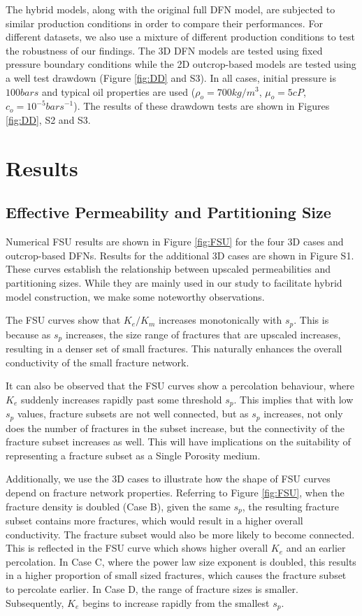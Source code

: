 \documentclass[draft]{agujournal2018}
\begin{document}
The hybrid models, along with the original full DFN model, are subjected to similar production conditions in order to compare their performances. For different datasets, we also use a mixture of different production conditions to test the robustness of our findings. The 3D DFN models are tested using fixed pressure boundary conditions while the 2D outcrop-based models are tested using a well test drawdown (Figure \ref{fig:DD} and S3). In all cases, initial pressure is $100 bars$ and typical oil properties are used ($\rho_o=700 kg/m^3$, $\mu_o=5 cP$, $c_o=10^{-5} {bars}^{-1}$). The results of these drawdown tests are shown in Figures \ref{fig:DD}, S2 and S3.

\section{Results}
\subsection{Effective Permeability and Partitioning Size}
Numerical FSU results are shown in Figure \ref{fig:FSU} for the four 3D cases and outcrop-based DFNs. Results for the additional 3D cases are shown in Figure S1. These curves establish the relationship between upscaled permeabilities and partitioning sizes. While they are mainly used in our study to facilitate hybrid model construction, we make some noteworthy observations.

The FSU curves show that $K_e/K_m$ increases monotonically with $s_p$. This is because as $s_p$ increases, the size range of fractures that are upscaled increases, resulting in a denser set of small fractures. This naturally enhances the overall conductivity of the small fracture network.

It can also be observed that the FSU curves show a percolation behaviour, where $K_e$ suddenly increases rapidly past some threshold $s_p$. This implies that with low $s_p$ values, fracture subsets are not well connected, but as $s_p$ increases, not only does the number of fractures in the subset increase, but the connectivity of the fracture subset increases as well. This will have implications on the suitability of representing a fracture subset as a Single Porosity medium.

Additionally, we use the 3D cases to illustrate how the shape of FSU curves depend on fracture network properties. Referring to Figure \ref{fig:FSU}, when the fracture density is doubled (Case B), given the same $s_p$, the resulting fracture subset contains more fractures, which would result in a higher overall conductivity. The fracture subset would also be more likely to become connected. This is reflected in the FSU curve which shows higher overall $K_e$ and an earlier percolation. In Case C, where the power law size exponent is doubled, this results in a higher proportion of small sized fractures, which causes the fracture subset to percolate earlier. In Case D, the range of fracture sizes is smaller. Subsequently, $K_e$ begins to increase rapidly from the smallest $s_p$.
\end{document}
